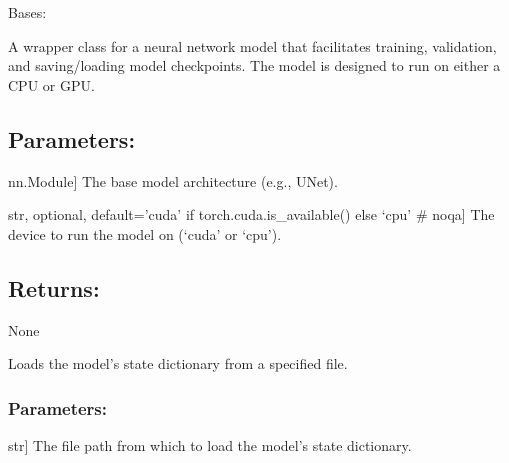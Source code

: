 \documentclass[a4paper,10pt,english]{sphinxmanual}
\begin{document}
\begin{fulllineitems}
\label{\detokenize{models:fireDiff.Models.deterministicmodel.PredictionModel}}
\pysigstartsignatures
{}
\pysigstopsignatures
\sphinxAtStartPar
Bases: 

\sphinxAtStartPar
A wrapper class for a neural network model that facilitates training,
validation, and saving/loading model checkpoints. The model is designed
to run on either a CPU or GPU.


\subsection{Parameters:}
\label{\detokenize{models:id28}}\begin{description}
\sphinxlineitem{model}{[}nn.Module{]}
\sphinxAtStartPar
The base model architecture (e.g., UNet).

\sphinxlineitem{device}{[}str, optional, default=’cuda’ if torch.cuda.is\_available() else ‘cpu’ \# noqa{]}
\sphinxAtStartPar
The device to run the model on (‘cuda’ or ‘cpu’).

\end{description}


\subsection{Returns:}
\label{\detokenize{models:id29}}
\sphinxAtStartPar
None

\begin{fulllineitems}
\label{\detokenize{models:fireDiff.Models.deterministicmodel.PredictionModel.load_model}}
\pysigstartsignatures
{}
\pysigstopsignatures
\sphinxAtStartPar
Loads the model’s state dictionary from a specified file.


\subsubsection{Parameters:}
\label{\detokenize{models:id30}}\begin{description}
\sphinxlineitem{path}{[}str{]}
\sphinxAtStartPar
The file path from which to load the model’s state dictionary.


\end{description}
\end{fulllineitems}
\end{fulllineitems}
\end{document}
